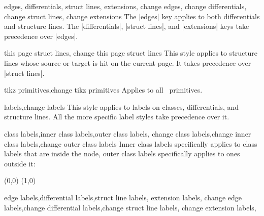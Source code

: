 \begin{sseqdata}[name = basic, cohomological Serre grading]
\begin{stylekeylist}{
    edges, differentials, struct lines, extensions,
    change edges, change differentials, change struct lines, change extensions
}%
The |edges| key applies to both differentials and structure lines. The
|differentials|, |struct lines|, and |extensions| keys take precedence over |edges|.
\end{stylekeylist}

\begin{stylekeylist}{this page struct lines, change this page struct lines}%
This style applies to structure lines whose source or target is hit on the
current page. It takes precedence over |struct lines|.
\end{stylekeylist}

\begin{stylekeylist}{tikz primitives,change tikz primitives}
Applies to all \tikzpkg\  primitives.
\end{stylekeylist}


\begin{stylekeylist}{labels,change labels}%
This style applies to labels on classes, differentials, and structure lines. All
the more specific label styles take precedence over it.
\end{stylekeylist}

\begin{stylekeylist}{
    class labels,inner class labels,outer class labels,
    change class labels,change inner class labels,change outer class labels
}%
Inner class labels specifically applies to class labels that are inside the
node, outer class labels specifically applies to ones outside it:
\begin{codeexample}[]
\begin{sseqpage}[ no axes, classes = { inner sep = 1pt },
    label distance = 2pt,
    outer class labels = { red },
    inner class labels = { blue } ]
\class["a", "b" above](0,0)
\class["a", "c" right](1,0)
\end{sseqpage}
\end{codeexample}
\end{stylekeylist}

\begin{stylekeylist}{
    edge labels,differential labels,struct line labels, extension labels,
    change edge labels,change differential labels,change struct line labels, change extension labels,
}%

\end{stylekeylist}



\end{sseqdata}
